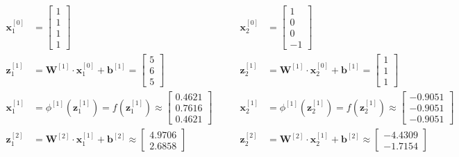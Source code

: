\documentclass[12pt]{article}
\begin{document}
\begin{enumerate}[leftmargin=\labelsep]
    \begin{equation}
    \begin{aligned}
        \mathbf{x}_1^{[0]} &= \begin{bmatrix}
            1 \\ 1 \\ 1 \\ 1
        \end{bmatrix} &\qquad \mathbf{x}_2^{[0]} &= \begin{bmatrix}
            1 \\ 0 \\ 0 \\ -1
        \end{bmatrix} \\
        \mathbf{z}_1^{[1]} &= \mathbf{W}^{[1]} \cdot \mathbf{x}_1^{[0]} + \mathbf{b}^{[1]} = \begin{bmatrix}
            5 \\ 6 \\ 5
        \end{bmatrix} &\qquad \mathbf{z}_2^{[1]} &= \mathbf{W}^{[1]} \cdot \mathbf{x}_2^{[0]} + \mathbf{b}^{[1]} = \begin{bmatrix}
            1 \\ 1 \\ 1
        \end{bmatrix} \\
        \mathbf{x}_1^{[1]} &= \phi^{[1]}(\mathbf{z}_1^{[1]}) = f(\mathbf{z}_1^{[1]}) \approx \begin{bmatrix}
            0.4621 \\ 0.7616 \\ 0.4621
        \end{bmatrix}&\qquad \mathbf{x}_2^{[1]} &= \phi^{[1]}(\mathbf{z}_2^{[1]}) = f(\mathbf{z}_2^{[1]}) \approx \begin{bmatrix}
            -0.9051 \\ -0.9051 \\ -0.9051
        \end{bmatrix} \\
        \mathbf{z}_1^{[2]} &= \mathbf{W}^{[2]} \cdot \mathbf{x}_1^{[1]} + \mathbf{b}^{[2]} \approx \begin{bmatrix}
            4.9706 \\ 2.6858
        \end{bmatrix} &\qquad \mathbf{z}_2^{[2]} &= \mathbf{W}^{[2]} \cdot \mathbf{x}_2^{[1]} + \mathbf{b}^{[2]} \approx \begin{bmatrix}
            -4.4309 \\ -1.7154

\end{bmatrix}
\end{aligned}
\end{equation}
\end{enumerate}
\end{document}

